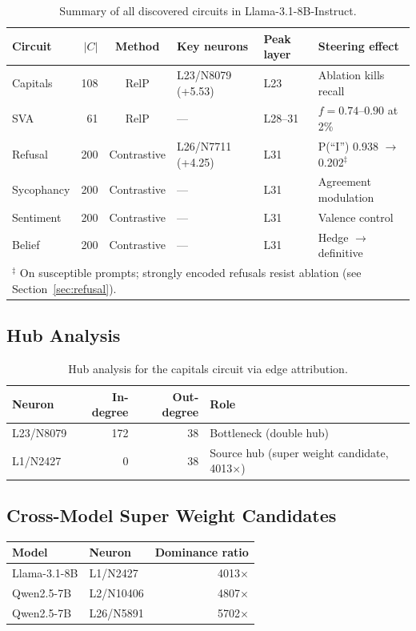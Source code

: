 \documentclass[11pt]{article}
\begin{document}
\begin{table}[h]
\centering
\caption{Summary of all discovered circuits in Llama-3.1-8B-Instruct.}
\label{tab:all_circuits}
\small
\begin{tabular}{lrclll}
\toprule
\textbf{Circuit} & \textbf{$|C|$} & \textbf{Method} & \textbf{Key neurons} & \textbf{Peak layer} & \textbf{Steering effect} \\
\midrule
Capitals  & 108 & RelP        & L23/N8079 (+5.53) & L23 & Ablation kills recall \\
SVA       &  61 & RelP        & --- & L28--31 & $f{=}0.74$--$0.90$ at 2\% \\
Refusal   & 200 & Contrastive & L26/N7711 (+4.25) & L31 & P(``I'') 0.938 $\to$ 0.202$^\ddagger$ \\
Sycophancy& 200 & Contrastive & --- & L31 & Agreement modulation \\
Sentiment & 200 & Contrastive & --- & L31 & Valence control \\
Belief    & 200 & Contrastive & --- & L31 & Hedge $\to$ definitive \\
\bottomrule
\multicolumn{6}{l}{\footnotesize $^\ddagger$ On susceptible prompts; strongly encoded refusals resist ablation (see Section~\ref{sec:refusal}).}
\end{tabular}
\end{table}


\subsection{Hub Analysis}

\begin{table}[h]
\centering
\caption{Hub analysis for the capitals circuit via edge attribution.}
\label{tab:hubs}
\small
\begin{tabular}{lrrl}
\toprule
\textbf{Neuron} & \textbf{In-degree} & \textbf{Out-degree} & \textbf{Role} \\
\midrule
L23/N8079 & 172 & 38 & Bottleneck (double hub) \\
L1/N2427  & 0   & 38 & Source hub (super weight candidate, 4013$\times$) \\
\bottomrule
\end{tabular}
\end{table}

\subsection{Cross-Model Super Weight Candidates}

\clearpage
\noindent
\centering
{}
\label{tab:superweights}

\small
\begin{tabular}{llr}
\toprule
\textbf{Model} & \textbf{Neuron} & \textbf{Dominance ratio} \\
\midrule
Llama-3.1-8B & L1/N2427  & 4013$\times$ \\
Qwen2.5-7B   & L2/N10406 & 4807$\times$ \\
Qwen2.5-7B   & L26/N5891 & 5702$\times$ \\
\bottomrule
\end{tabular}
\end{document}
